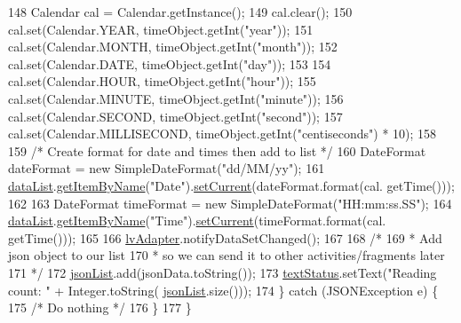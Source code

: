 \begin{DoxyCode}
148             Calendar cal = Calendar.getInstance();
149             cal.clear();
150             cal.set(Calendar.YEAR, timeObject.getInt(\textcolor{stringliteral}{"year"}));
151             cal.set(Calendar.MONTH, timeObject.getInt(\textcolor{stringliteral}{"month"}));
152             cal.set(Calendar.DATE, timeObject.getInt(\textcolor{stringliteral}{"day"}));
153 
154             cal.set(Calendar.HOUR, timeObject.getInt(\textcolor{stringliteral}{"hour"}));
155             cal.set(Calendar.MINUTE, timeObject.getInt(\textcolor{stringliteral}{"minute"}));
156             cal.set(Calendar.SECOND, timeObject.getInt(\textcolor{stringliteral}{"second"}));
157             cal.set(Calendar.MILLISECOND, timeObject.getInt(\textcolor{stringliteral}{"centiseconds"}) * 10);
158 
159             \textcolor{comment}{/* Create format for date and times then add to list */}
160             DateFormat dateFormat = \textcolor{keyword}{new} SimpleDateFormat(\textcolor{stringliteral}{"dd/MM/yy"});
161             \hyperlink{class_android_app_1_1_realtime_fragment_ab1c4983b61e50b501ed22842253bf849}{dataList}.\hyperlink{class_android_app_1_1_set_of_data_items_aa559ef3701bb9f59f124ddddc56a2a38}{getItemByName}(\textcolor{stringliteral}{"Date"}).\hyperlink{class_android_app_1_1_data_item_a6cd8975067d5be2d5eaac137a94c0eac}{setCurrent}(dateFormat.format(cal.
      getTime()));
162 
163             DateFormat timeFormat = \textcolor{keyword}{new} SimpleDateFormat(\textcolor{stringliteral}{"HH:mm:ss.SS"});
164             \hyperlink{class_android_app_1_1_realtime_fragment_ab1c4983b61e50b501ed22842253bf849}{dataList}.\hyperlink{class_android_app_1_1_set_of_data_items_aa559ef3701bb9f59f124ddddc56a2a38}{getItemByName}(\textcolor{stringliteral}{"Time"}).\hyperlink{class_android_app_1_1_data_item_a6cd8975067d5be2d5eaac137a94c0eac}{setCurrent}(timeFormat.format(cal.
      getTime()));
165 
166             \hyperlink{class_android_app_1_1_realtime_fragment_afeafb95e85d8ba0b9c50aa36af2f4216}{lvAdapter}.notifyDataSetChanged();
167 
168             \textcolor{comment}{/*}
169 \textcolor{comment}{             * Add json object to our list}
170 \textcolor{comment}{             * so we can send it to other activities/fragments later}
171 \textcolor{comment}{             */}
172             \hyperlink{class_android_app_1_1_realtime_fragment_a4c3f12bcaaab715dc512d4cd4a4c11cf}{jsonList}.add(jsonData.toString());
173             \hyperlink{class_android_app_1_1_realtime_fragment_a8aa6530bcc9c6ef17627f1395ff7910d}{textStatus}.setText(\textcolor{stringliteral}{"Reading count: "} + Integer.toString(
      \hyperlink{class_android_app_1_1_realtime_fragment_a4c3f12bcaaab715dc512d4cd4a4c11cf}{jsonList}.size()));
174         \} \textcolor{keywordflow}{catch} (JSONException e) \{
175             \textcolor{comment}{/* Do nothing */}
176         \}
177     \}
\end{DoxyCode}


